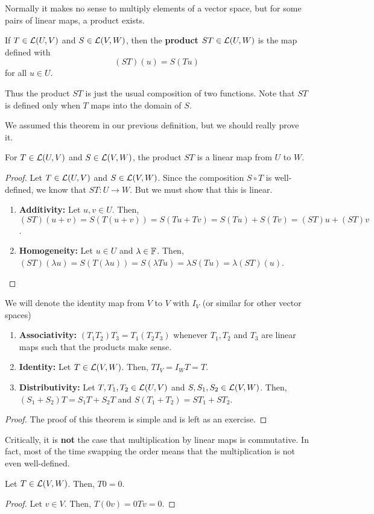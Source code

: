 Normally it makes no sense to multiply elements of a vector space, but for some pairs of linear maps, a product exists.
\begin{definition}
    If $T\in \mathcal{L}(U,V)$ and $S\in \mathcal{L} (V,W)$, then the \textbf{product} $ST\in \mathcal{L}(U, W)$ is the map defined with
    \[ (ST)(u) = S(Tu) \]
    for all $u\in U$.
\end{definition}
Thus the product $ST$ is just the usual composition of two functions. Note that $ST$ is defined only when $T$ maps into the domain of $S$.
\begin{theorem}
    We assumed this theorem in our previous definition, but we should really prove it. 
    
    For $T\in \mathcal{L}(U,V)$ and $S\in\mathcal{L}(V,W)$, the product $ST$ is a linear map from $U$ to $W$.
\end{theorem}
\begin{proof}
    Let $T\in\mathcal{L}(U,V)$ and $S\in\mathcal{L}(V,W)$. Since the composition $S\circ T$ is well-defined, we know that $ST : U \to W$. But we must show that this is linear.

    \begin{enumerate}
        \item \textbf{Additivity:} Let $u, v\in U$. Then, $(ST)(u+v) = S(T(u+v)) = S(Tu+Tv) = S(Tu) + S(Tv) = (ST)u + (ST)v$.
        \item \textbf{Homogeneity:} Let $u\in U$ and $\lambda\in\mathbb F$. Then, $(ST)(\lambda u) = S(T(\lambda u)) = S(\lambda Tu) = \lambda S(Tu) = \lambda (ST)(u)$.
    \end{enumerate}
\end{proof}
We will denote the identity map from $V$ to $V$ with $I_V$ (or similar for other vector spaces)
\begin{theorem}
    \begin{enumerate}
        \item \textbf{Associativity:} $(T_1T_2)T_3 = T_1(T_2T_3)$ whenever $T_1, T_2$ and $T_3$ are linear maps such that the products make sense. 
        \item \textbf{Identity:} Let $T\in \mathcal{L}(V,W)$. Then, $TI_V = I_WT = T$.
        \item \textbf{Distributivity:} Let $T,T_1, T_2\in \mathcal{L}(U,V)$ and $S,S_1,S_2\in\mathcal{L}(V,W)$. Then, $(S_1+S_2)T = S_1T + S_2T$ and $S(T_1+T_2) = ST_1 + ST_2$.
    \end{enumerate}
\end{theorem}
\begin{proof}
    The proof of this theorem is simple and is left as an exercise.
\end{proof}
Critically, it is \textbf{not} the case that multiplication by linear maps is commutative. In fact, most of the time swapping the order means that the multiplication is not even well-defined.
\begin{theorem}
    Let $T\in\mathcal{L}(V,W)$. Then, $T0=0$.
\end{theorem}
\begin{proof}
    Let $v\in V$. Then, $T(0v) = 0Tv = 0$.
\end{proof}
